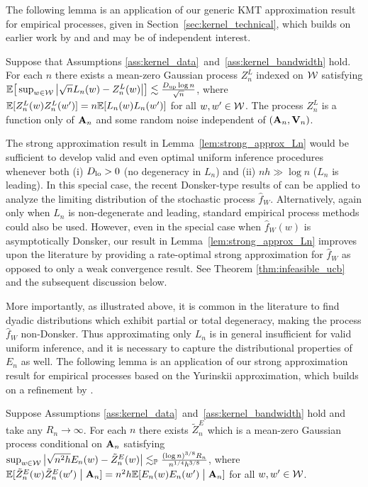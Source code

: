 The following lemma is an application of our generic
KMT approximation result for empirical processes,
given in Section~\ref{sec:kernel_technical},
which builds on earlier work by \citet{gine2004kernel}
and \citet{gine2010confidence} and may be of independent interest.

\begin{lemma}
  \label{lem:strong_approx_Ln}
  Suppose that Assumptions
  \ref{ass:kernel_data}~and~\ref{ass:kernel_bandwidth} hold.
  For each $n$ there exists
  a mean-zero Gaussian process
  $Z^L_n$ indexed on $\mathcal{W}$ satisfying
  $\mathbb{E}\big[ \sup_{w \in \mathcal{W}} \big| \sqrt{n} L_n(w) -  Z_n^L(w) \big| \big]
  \lesssim \frac{D_{\textup{up}} \log n}{\sqrt{n}}$,
  where $\mathbb{E}[Z_n^L(w)Z_n^L(w')] =  n\mathbb{E}[L_n(w)L_n(w')]$ for all $w, w' \in \mathcal{W}$.
  The process $Z_n^L$
  is a function only of $\mathbf{A}_n$ and some random noise
  independent of $(\mathbf{A}_n, \mathbf{V}_n)$.
\end{lemma}

The strong approximation result in Lemma~\ref{lem:strong_approx_Ln} would be
sufficient to develop valid and even optimal
uniform inference procedures whenever both
(i) $D_{\textup{lo}} > 0$ (no degeneracy in $L_n$) and
(ii) $n h \gg \log n$ ($L_n$ is leading).
In this special case, the recent Donsker-type results of
\citet{davezies2021exchangeable}
can be applied to analyze the limiting distribution
of the stochastic process $\hat{f}_W$.
Alternatively,
again only when $L_n$ is non-degenerate and leading,
standard empirical process methods could also be used.
However, even in the special case when $\hat{f}_W(w)$ is asymptotically
Donsker, our result in Lemma~\ref{lem:strong_approx_Ln}
improves upon the literature by providing a rate-optimal strong approximation
for $\hat{f}_W$ as opposed to only a weak convergence result.
See Theorem \ref{thm:infeasible_ucb} and the subsequent
discussion below.

More importantly, as illustrated above,
it is common in the literature to find dyadic
distributions which exhibit partial or total degeneracy, making the process
$\hat{f}_W$ non-Donsker.
Thus approximating only $L_n$ is in general insufficient
for valid uniform inference,
and it is necessary to capture the distributional properties of $E_n$ as well.
The following lemma is an application of
our strong approximation result for
empirical processes based on the Yurinskii approximation,
which builds on a refinement by \citet{belloni2019conditional}.

\begin{lemma}
  \label{lem:conditional_strong_approx_En}

  Suppose Assumptions
  \ref{ass:kernel_data}~and~\ref{ass:kernel_bandwidth} hold
  and take any $R_n \to \infty$.
  For each $n$ there exists
  $\tilde Z^E_n$
  which is a mean-zero Gaussian process
  conditional on $\mathbf{A}_n$ satisfying
  $\sup_{w \in \mathcal{W}}
  \big| \sqrt{n^2h} E_n(w) - \tilde Z_n^E(w) \big|
  \lesssim_{\mathbb{P}} \frac{(\log n)^{3/8} R_n}{n^{1/4}h^{3/8}}$,
  where $\mathbb{E}[\tilde Z_n^E(w)\tilde Z_n^E(w')\bigm\vert \mathbf{A}_n]
  =n^2h\mathbb{E}[E_n(w)E_n(w')\bigm\vert \mathbf{A}_n]$
  for all $w, w' \in \mathcal{W}$.
\end{lemma}

